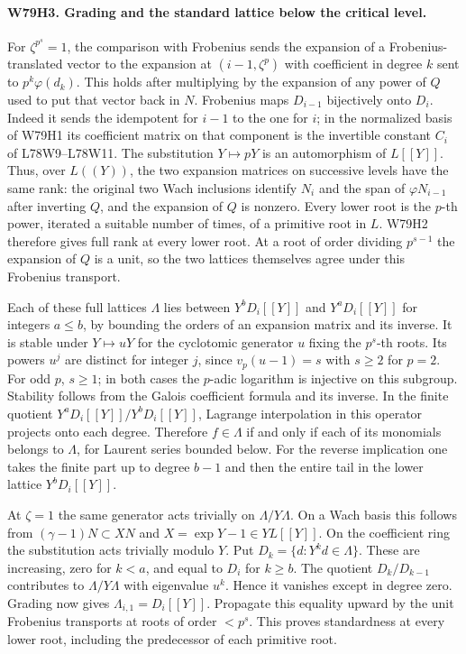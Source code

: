 \paragraph{W79H3. Grading and the standard lattice below the critical level.}
For $\zeta^{p^s}=1$, the comparison with Frobenius sends the
expansion of a Frobenius-translated vector to the expansion
at $(i-1,\zeta^p)$ with coefficient in degree $k$ sent to
$p^k\varphi(d_k)$. This holds after multiplying by the expansion
of any power of $Q$ used to put that vector back in $N$.
Frobenius maps $D_{i-1}$ bijectively onto $D_i$.
Indeed it sends the idempotent for $i-1$ to the one for $i$;
in the normalized basis of W79H1 its coefficient matrix on that
component is the invertible constant $C_i$ of L78W9--L78W11. The substitution $Y\mapsto pY$
is an automorphism of $L[[Y]]$. Thus, over $L((Y))$, the two
expansion matrices on successive levels have the same rank:
the original two Wach inclusions identify $N_i$ and the span of
$\varphi N_{i-1}$ after inverting $Q$, and the expansion of $Q$
is nonzero. Every lower root is the $p$-th power, iterated a
suitable number of times, of a primitive root in $L$.
W79H2 therefore gives full rank at every lower root. At a root
of order dividing $p^{s-1}$ the expansion of $Q$ is a unit,
so the two lattices themselves agree under this Frobenius transport.

Each of these full lattices $\Lambda$ lies between
$Y^bD_i[[Y]]$ and $Y^aD_i[[Y]]$ for integers $a\le b$,
by bounding the orders of an expansion matrix and its inverse.
It is stable under $Y\mapsto uY$ for the cyclotomic generator
$u$ fixing the $p^s$-th roots. Its powers $u^j$ are distinct
for integer $j$, since $v_p(u-1)=s$ with $s\ge2$ for $p=2$.
For odd $p$, $s\ge1$; in both cases the $p$-adic logarithm is
injective on this subgroup. Stability follows from the Galois
coefficient formula and its inverse. In the finite quotient
$Y^aD_i[[Y]]/Y^bD_i[[Y]]$, Lagrange interpolation in this operator
projects onto each degree. Therefore $f\in\Lambda$ if and only if
each of its monomials belongs to $\Lambda$, for Laurent series
bounded below. For the reverse implication one takes the finite
part up to degree $b-1$ and then the entire tail in the lower
lattice $Y^bD_i[[Y]]$.

At $\zeta=1$ the same generator acts trivially on
$\Lambda/Y\Lambda$. On a Wach basis this follows from
$(\gamma-1)N\subset XN$ and $X=\exp Y-1\in YL[[Y]]$.
On the coefficient ring the substitution acts trivially modulo $Y$.
Put $D_k=\{d:Y^kd\in\Lambda\}$. These are increasing, zero for
$k<a$, and equal to $D_i$ for $k\ge b$. The quotient
$D_k/D_{k-1}$ contributes to $\Lambda/Y\Lambda$ with eigenvalue
$u^k$. Hence it vanishes except in degree zero. Grading now gives
$\Lambda_{i,1}=D_i[[Y]]$. Propagate this equality upward by
the unit Frobenius transports at roots of order $<p^s$. This
proves standardness at every lower root, including the predecessor
of each primitive root.

